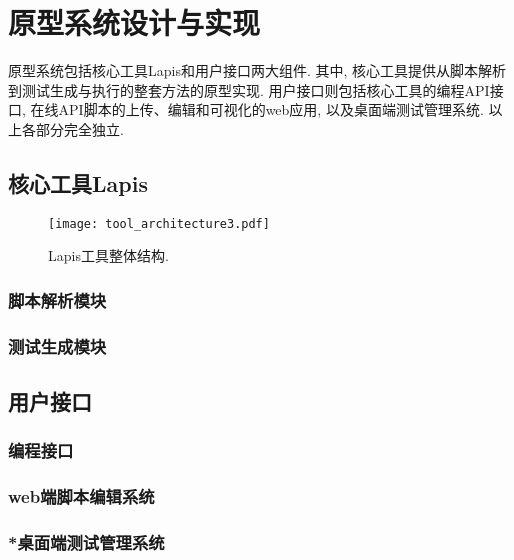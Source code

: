 \chapter{原型系统设计与实现}

    原型系统包括核心工具Lapis和用户接口两大组件. 其中, 核心工具提供从脚本解析到测试生成与执行的整套方法的原型实现. 用户接口则包括核心工具的编程API接口, 在线API脚本的上传、编辑和可视化的web应用, 以及桌面端测试管理系统. 以上各部分完全独立.

	\section{核心工具Lapis}
	    \begin{figure}
	        \centering
	        \texttt{[image: tool\_architecture3.pdf]}
	        \caption{Lapis工具整体结构.}
	        \label{fig:lapis_arch}
	    \end{figure}
	    
    	\subsection{脚本解析模块}
    
    	\subsection{测试生成模块}

	\section{用户接口}
		\subsection{编程接口}

		\subsection{web端脚本编辑系统}

		\subsection{*桌面端测试管理系统}


